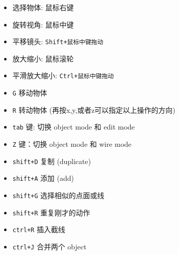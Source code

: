 
\begin{itemize}
\item 选择物体: 鼠标右键
\item 旋转视角: 鼠标中键
\item 平移镜头: \verb|Shift+鼠标中键拖动|
\item 放大缩小: 鼠标滚轮
\item 平滑放大缩小: \verb|Ctrl+鼠标中键拖动|
\item \verb|G| 移动物体
\item \verb|R| 转动物体 (再按x,y,或者z可以指定以上操作的方向)
\item \verb|tab| 键: 切换 object mode 和 edit mode
\item \verb|Z| 键：切换 object mode 和 wire mode
\item \verb|shift+D| 复制 (duplicate)
\item \verb|shift+A| 添加 (add)
\item \verb|shift+G| 选择相似的点面或线
\item \verb|shift+R| 重复刚才的动作
\item \verb|ctrl+R| 插入截线
\item \verb|ctrl+J| 合并两个 object
\end{itemize}
